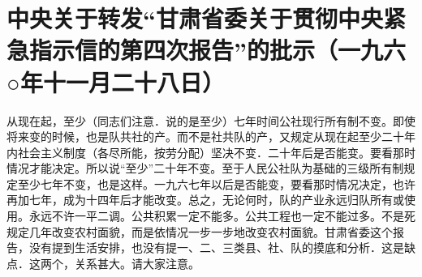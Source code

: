 \section[中央关于转发“甘肃省委关于贯彻中央紧急指示信的第四次报告”的批示（一九六○年十一月二十八日）]{中央关于转发“甘肃省委关于贯彻中央紧急指示信的第四次报告”的批示（一九六○年十一月二十八日）}


从现在起，至少（同志们注意．说的是至少）七年时间公社现行所有制不变。即使将来变的时候，也是队共社的产。而不是社共队的产，又规定从现在起至少二十年内社会主义制度（各尽所能，按劳分配）坚决不变．二十年后是否能变。要看那时情况才能决定。所以说“至少”二十年不变。至于人民公社队为基础的三级所有制规定至少七年不变，也是这样。一九六七年以后是否能变，要看那时情况决定，也许再加七年，成为十四年后才能改变。总之，无论何时，队的产业永远归队所有或使用。永远不许一平二调。公共积累一定不能多。公共工程也一定不能过多。不是死规定几年改变农村面貌，而是依情况一步一步地改变农村面貌。甘肃省委这个报告，没有提到生活安排，也没有提一、二、三类县、社、队的摸底和分析．这是缺点．这两个，关系甚大。请大家注意。


